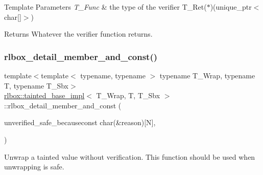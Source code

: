 \begin{DoxyTemplParams}{Template Parameters}
{\em T\+\_\+\+Func} & the type of the verifier {\ttfamily T\+\_\+\+Ret($\ast$)(unique\+\_\+ptr$<$char\mbox{[}\mbox{]}$>$)} \\
\hline
\end{DoxyTemplParams}
\begin{DoxyReturn}{Returns}
Whatever the verifier function returns. 
\end{DoxyReturn}
\mbox{\label{classrlbox_1_1tainted__base__impl_ac7d2f71a8fc72b922bfa1260d4a7ac94}} 
\subsubsection{\texorpdfstring{rlbox\+\_\+detail\+\_\+member\+\_\+and\+\_\+const()}{rlbox\_detail\_member\_and\_const()}}
{\footnotesize\ttfamily template$<$template$<$ typename, typename $>$ typename T\+\_\+\+Wrap, typename T, typename T\+\_\+\+Sbx$>$ \\
\hyperlink{classrlbox_1_1tainted__base__impl}{rlbox\+::tainted\+\_\+base\+\_\+impl}$<$ T\+\_\+\+Wrap, T, T\+\_\+\+Sbx $>$\+::rlbox\+\_\+detail\+\_\+member\+\_\+and\+\_\+const (\begin{DoxyParamCaption}\item[{template$<$ size\+\_\+t N $>$ inline auto }]{unverified\+\_\+safe\+\_\+becauseconst char(\&reason)\mbox{[}\+N\mbox{]},  }\item[{\{ R\+L\+B\+O\+X\+\_\+\+U\+N\+U\+S\+ED(reason);static\+\_\+assert(!std\+::is\+\_\+pointer\+\_\+v$<$ T $>$, \char`\"{}unverified\+\_\+safe\+\_\+because does not support pointers. Use \char`\"{} \char`\"{}unverified\+\_\+safe\+\_\+pointer\+\_\+because.\char`\"{});return \hyperlink{classrlbox_1_1tainted__base__impl_a01acab6b4bd8137afa03cf4b2678844f}{U\+N\+S\+A\+F\+E\+\_\+unverified}();\}}]{ }\end{DoxyParamCaption})}



Unwrap a tainted value without verification. This function should be used when unwrapping is safe. 


